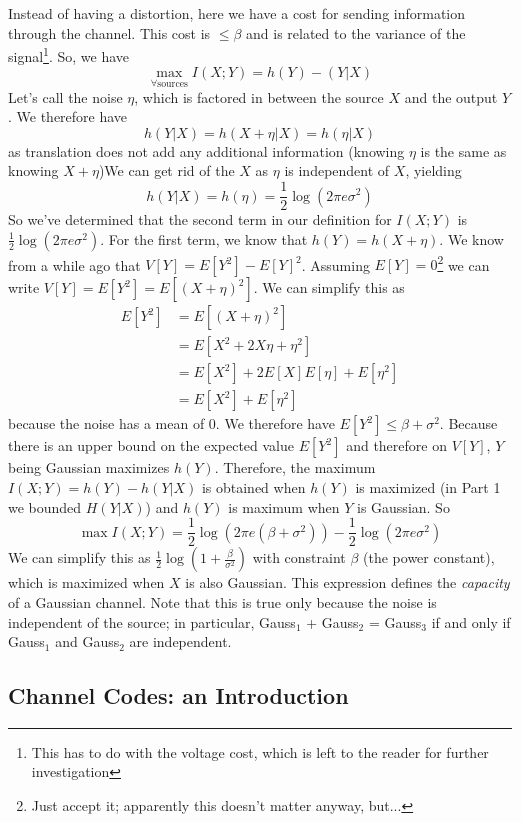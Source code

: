 \documentclass[11pt]{article}
\theoremstyle{definition}
\begin{document}
Instead of having a distortion, here we have a cost for sending information through the channel. This cost is $\leq \beta$ and is related to the variance of the signal\footnote{This has to do with the voltage cost, which is left to the reader for further investigation}. So, we have $$\max_{\forall \text{sources}} I(X;Y) = h(Y) - (Y|X)$$Let's call the noise $\eta$, which is factored in between the source $X$ and the output $Y$. We therefore have $$h(Y|X) = h(X+\eta | X) = h(\eta | X)$$as translation does not add any additional information (knowing $\eta$ is the same as knowing $X + \eta$)We can get rid of the $X$ as $\eta$ is independent of $X$, yielding $$h(Y|X) = h(\eta) = \frac{1}{2}\log(2\pi e \sigma^2)$$So we've determined that the second term in our definition for $I(X;Y)$ is $\frac{1}{2} \log (2 \pi e \sigma^2)$. For the first term, we know that $h(Y) = h(X+\eta)$. We know from a while ago that $V[Y] = E[Y^2] - E[Y]^2$. Assuming $E[Y] = 0$\footnote{Just accept it; apparently this doesn't matter anyway, but...} we can write $V[Y] = E[Y^2] = E[(X + \eta)^2]$. We can simplify this as \begin{align*}
E[Y^2] &= E[(X + \eta)^2] \\
	&= E[X^2 + 2X\eta + \eta^2] \\
	&= E[X^2] + 2E[X]E[\eta] + E[\eta^2] \\
	&= E[X^2] + E[\eta^2]
\end{align*}
because the noise has a mean of 0. We therefore have $E[Y^2] \leq \beta + \sigma^2$. Because there is an upper bound on the expected value $E[Y^2]$ and therefore on $V[Y]$, $Y$ being Gaussian maximizes $h(Y)$. Therefore, the maximum $I(X;Y) = h(Y) - h(Y|X)$ is obtained when $h(Y)$ is maximized (in Part 1 we bounded $H(Y|X)$) and $h(Y)$ is maximum when $Y$ is Gaussian. So $$\max I(X;Y) = \frac{1}{2}\log(2\pi e (\beta + \sigma^2)) - \frac{1}{2} \log (2 \pi e \sigma^2)$$We can simplify this as $\frac{1}{2} \log (1 + \frac{\beta}{\sigma^2})$ with constraint $\beta$ (the power constant), which is maximized when $X$ is also Gaussian. This expression defines the \textit{capacity} of a Gaussian channel. Note that this is true only because the noise is independent of the source; in particular, Gauss$_1$ + Gauss$_2$ = Gauss$_3$ if and only if Gauss$_1$ and Gauss$_2$ are independent. 

\subsection{Channel Codes: an Introduction}
\end{document}
